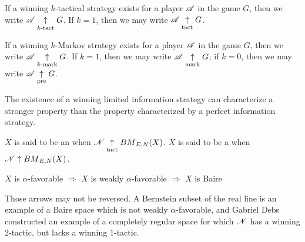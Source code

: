 \begin{defn}
  If a winning $k$-tactical strategy exists for a player $\mathscr{A}$ in the game
  $G$, then we write $\mathscr{A} \underset{k\text{-tact}}{\uparrow} G$. If $k=1$, then
  we may write $\mathscr{A} \underset{\text{tact}}{\uparrow} G$.

  If a winning $k$-Markov strategy exists for a player $\mathscr{A}$ in the game
  $G$, then we write $\mathscr{A} \underset{k\text{-mark}}{\uparrow} G$. If $k=1$, then we may write
  $\mathscr{A} \underset{\text{mark}}{\uparrow} G$;
  if $k=0$, then we may write $\mathscr{A} \underset{\text{pre}}{\uparrow} G$.
\end{defn}

The existence of a winning limited information strategy can characterize a
stronger property than the property characterized by a perfect information
strategy.

\begin{defn}
  $X$ is said to be an 
  when $\mathscr{N} \underset{\text{tact}}{\uparrow} {BM}_{E,N}(X)$.
  $X$ is said to be a 
  when $\mathscr{N} \uparrow {BM}_{E,N}(X)$.
\end{defn}

\begin{prop}
  $X$ is $\alpha$-favorable
    $\Rightarrow$
  $X$ is weakly $\alpha$-favorable
    $\Rightarrow$
  $X$ is Baire
\end{prop}

Those arrows may not be reversed. A Bernstein subset of the real line is an
example of a Baire space which is not weakly $\alpha$-favorable, and Gabriel
Debs constructed an example of a completely regular space for which $\mathscr{N}$
has a winning $2$-tactic, but lacks a winning $1$-tactic. \cite{MR817083}
